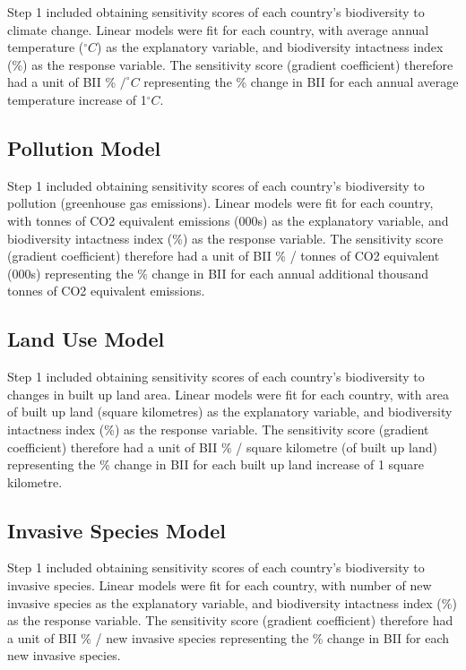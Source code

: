 \documentclass[11pt, a4paper, titlepage]{article}
\begin{document}
	Step 1 included obtaining sensitivity scores of each country's biodiversity to climate change. Linear models were fit for each country, with average annual temperature ($^\circ C$) as the explanatory variable, and biodiversity intactness index (\%) as the response variable. The sensitivity score (gradient coefficient) therefore had a unit of BII \% $/ ^\circ C$ representing the \% change in BII for each annual average temperature increase of 1$^\circ C$.
	
	\subsection*{Pollution Model}
	
	Step 1 included obtaining sensitivity scores of each country's biodiversity to pollution (greenhouse gas emissions). Linear models were fit for each country, with tonnes of CO2 equivalent emissions (000s) as the explanatory variable, and biodiversity intactness index (\%) as the response variable. The sensitivity score (gradient coefficient) therefore had a unit of BII \% / tonnes of CO2 equivalent (000s) representing the \% change in BII for each annual additional thousand tonnes of CO2 equivalent emissions. 
	
	\subsection*{Land Use Model}
	
	Step 1 included obtaining sensitivity scores of each country's biodiversity to changes in built up land area. Linear models were fit for each country, with area of built up land (square kilometres) as the explanatory variable, and biodiversity intactness index (\%) as the response variable. The sensitivity score (gradient coefficient) therefore had a unit of BII \% / square kilometre (of built up land) representing the \% change in BII for each built up land increase of 1 square kilometre.
	
	\subsection*{Invasive Species Model}
	
	Step 1 included obtaining sensitivity scores of each country's biodiversity to invasive species. Linear models were fit for each country, with number of new invasive species as the explanatory variable, and biodiversity intactness index (\%) as the response variable. The sensitivity score (gradient coefficient) therefore had a unit of BII \% / new invasive species representing the \% change in BII for each new invasive species. 
	
\end{document}
